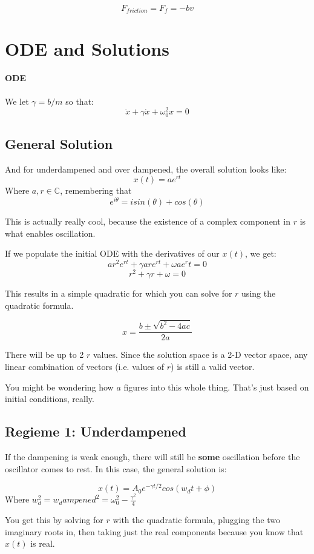 \documentclass[a4paper,12pt]{report}
\begin{document}
$$F_{friction} = F_f = -bv$$

\section{ODE and Solutions}
\paragraph{ODE}
We let $\gamma = b/m$ so that:
$$\ddot{x} + \gamma \dot{x} + \omega_0^2 x = 0$$

\subsection{General Solution}

And for underdampened and over dampened, the overall solution looks like:
$$x(t) = ae^{rt}$$
Where $a, r \in \mathbb{C}$, remembering that $$e^{i \theta} = i sin(\theta) + cos(\theta)$$

This is actually really cool, because the existence of a complex component in $r$ is what 
enables oscillation. 

If we populate the initial ODE with the derivatives of our $x(t)$, we get:
$$ar^2e^{rt} + \gamma are^{rt} + \omega ae^rt = 0$$
$$r^2 + \gamma r + \omega = 0$$

This results in a simple quadratic for which you can solve for $r$ using the quadratic formula.

$$x = \frac{b \pm \sqrt{b^2 - 4ac}}{2a}$$

There will be up to 2 $r$ values. Since the solution space is a 2-D vector space, any 
linear combination of vectors (i.e. values of $r$) is still a valid vector.

You might be wondering how $a$ figures into this whole thing. That's just based on initial
conditions, really. 

\subsection{Regieme 1: Underdampened}
If the dampening is weak enough, there will still be \textbf{some} oscillation before the 
oscillator comes to rest. In this case, the general solution is:

$$x(t) = A_0 e^{-\gamma t/2} cos(w_dt + \phi)$$
Where $w_d^2 = w_dampened^2 = \omega_0^2 - \frac{\gamma^2}{4}$

You get this by solving for $r$ with the quadratic formula, plugging the two imaginary 
roots in, then taking just the real components because you know that $x(t)$ is real.
\end{document}

